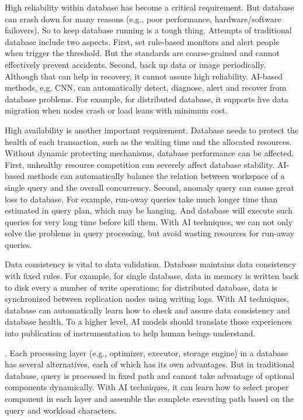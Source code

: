 High reliability within database has become a critical requirement. But database can crash down for many reasons (e.g., poor performance, hardware/software failovers). So to keep database running is a tough thing. Attempts of traditional database include two aspects. First, set rule-based monitors and alert people when trigger the threshold. But the standards are coarse-grained and cannot effectively prevent accidents. Second, back up data or image periodically. Although that can help in recovery, it cannot assure high reliability. AI-based methods, e,g, CNN, can automatically detect, diagnose, alert and recover from database problems. For example, for distributed database, it supports live data migration when nodes crash or load leans with minimum cost. 

 High availability is another important requirement. Database needs to protect the health of each transaction, such as the waiting time and the allocated resources.  Without dynamic protecting mechanisms, database performance can be affected. First, unhealthy resource competition can severely affect database stability. AI-based methods can automatically balance the relation between workspace of a single query and the overall concurrency. Second, anomaly query can cause great loss to database. For example, run-away queries take much longer time than estimated in query plan, which may be hanging. And database will execute such queries for very long time before kill them. With AI techniques, we can not only solve the problems in query processing, but avoid wasting resources for run-away queries.

 Data consistency is vital to data validation. Database maintains data consistency with fixed rules. For example, for single database, data in memory is written back to disk every a number of write operations; for distributed database, data is synchronized between replication nodes using writing logs. With AI techniques, database can automatically learn how to check and assure data consistency and database health. To a higher level, AI models should translate those experiences into publication of instrumentation to help human beings understand.

. Each processing layer (e.g., optimizer, executor, storage engine) in a database has several alternatives, each of which has its own advantages. But in traditional database, query is processed in fixed path and cannot take advantage of optional components dynamically. With AI techniques, it can learn how to select proper component in each layer and assemble the complete executing path based on the query and workload characters.


